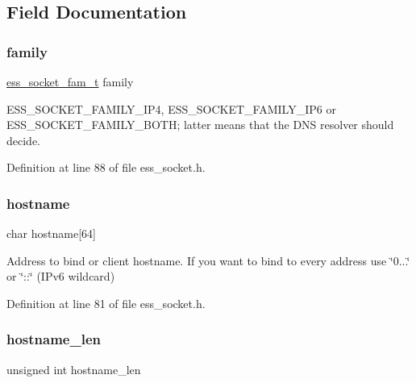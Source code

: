 \subsection{Field Documentation}
\mbox{\label{structess__socket_ad09623d57ebd33fef8dac4e18c0cba2f}} 
\subsubsection{\texorpdfstring{family}{family}}
{\footnotesize\ttfamily \hyperlink{ess__socket_8h_a9305eae437d57846661e997bb755d150}{ess\+\_\+socket\+\_\+fam\+\_\+t} family}

{\ttfamily E\+S\+S\+\_\+\+S\+O\+C\+K\+E\+T\+\_\+\+F\+A\+M\+I\+L\+Y\+\_\+\+I\+P4}, {\ttfamily E\+S\+S\+\_\+\+S\+O\+C\+K\+E\+T\+\_\+\+F\+A\+M\+I\+L\+Y\+\_\+\+I\+P6} or {\ttfamily E\+S\+S\+\_\+\+S\+O\+C\+K\+E\+T\+\_\+\+F\+A\+M\+I\+L\+Y\+\_\+\+B\+O\+TH}; latter means that the D\+NS resolver should decide. 

Definition at line 88 of file ess\+\_\+socket.\+h.

\mbox{\label{structess__socket_a0c6be700c8763c26054098348ebef8d6}} 
\subsubsection{\texorpdfstring{hostname}{hostname}}
{\footnotesize\ttfamily char hostname\mbox{[}64\mbox{]}}

Address to bind or client hostname. If you want to bind to every address use \char`\"{}0...\char`\"{} or \char`\"{}\+::\char`\"{} (I\+Pv6 wildcard) 

Definition at line 81 of file ess\+\_\+socket.\+h.

\mbox{\label{structess__socket_a4d0d74743d167680649419163ce8c80e}} 
\subsubsection{\texorpdfstring{hostname\+\_\+len}{hostname\_len}}
{\footnotesize\ttfamily unsigned int hostname\+\_\+len}



